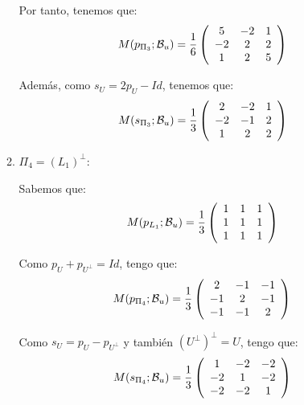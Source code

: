 \begin{ejercicio}
\begin{enumerate}
\begin{enumerate}
        Por tanto, tenemos que:
        \begin{equation*}
            M(p_{\Pi_3};\mathcal{B}_u)=\frac{1}{6}\left(\begin{array}{ccc}
                 5 & -2 & 1 \\
                 -2 & 2 & 2 \\
                 1 & 2 & 5 \\
            \end{array}\right)
        \end{equation*}

        Además, como $s_U = 2p_U - Id$, tenemos que:
        \begin{equation*}
            M(s_{\Pi_3};\mathcal{B}_u)=\frac{1}{3}\left(\begin{array}{ccc}
                 2 & -2 & 1 \\
                 -2 & -1 & 2 \\
                 1 & 2 & 2 \\
            \end{array}\right)
        \end{equation*}

        
        
        
        \item $\Pi_4=(L_1)^\perp$:

        Sabemos que:
        \begin{equation*}
            M(p_{L_1};\mathcal{B}_u)=\frac{1}{3}\left(\begin{array}{ccc}
                 1 & 1 & 1 \\
                 1 & 1 & 1 \\
                 1 & 1 & 1 \\
            \end{array}\right)
        \end{equation*}

        Como $p_U + p_{U^\perp}=Id$, tengo que:
        \begin{equation*}
            M(p_{\Pi_4};\mathcal{B}_u)=\frac{1}{3}\left(\begin{array}{ccc}
                 2 & -1 & -1 \\
                 -1 & 2 & -1 \\
                 -1 & -1 & 2 \\
            \end{array}\right)
        \end{equation*}

        Como $s_U=p_U-p_{U^\perp}$ y también $(U^\perp)^\perp = U$, tengo que:
        \begin{equation*}
            M(s_{\Pi_4};\mathcal{B}_u)=\frac{1}{3}\left(\begin{array}{ccc}
                 1 & -2 & -2 \\
                 -2 & 1 & -2 \\
                 -2 & -2 & 1 \\
            \end{array}\right)
        \end{equation*}


\end{enumerate}
\end{enumerate}
\end{ejercicio}
